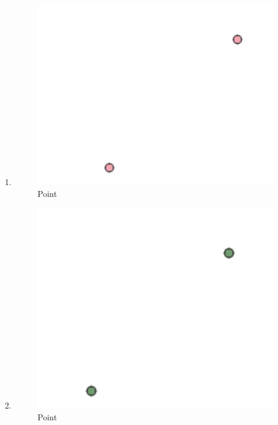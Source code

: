 \begin{enumerate}
	\item 
	
	\begin{figure}[H]
		\includegraphics[width=12cm]{figures/1174008/2/hasilsoal3.PNG}
		\centering
		\caption{Point}
	\end{figure}
	
	\item 
	
	\begin{figure}[H]
		\includegraphics[width=12cm]{figures/1174008/2/hasilsoal4.PNG}
		\centering
		\caption{Point}
	\end{figure}
	

\end{enumerate}
